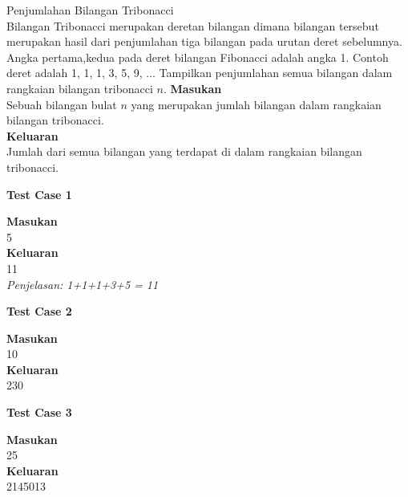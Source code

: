 \newpage
\begin{permasalahan}{Penjumlahan Bilangan Tribonacci}\\
	Bilangan Tribonacci merupakan deretan bilangan dimana bilangan tersebut merupakan hasil dari penjumlahan tiga bilangan pada urutan deret sebelumnya. Angka pertama,kedua pada deret bilangan Fibonacci adalah angka 1. Contoh deret adalah 1, 1, 1, 3, 5, 9, ... Tampilkan penjumlahan semua bilangan dalam rangkaian bilangan tribonacci $n$.
	\textbf{Masukan}\\
	Sebuah bilangan  bulat $n$ yang merupakan jumlah bilangan dalam rangkaian bilangan tribonacci.\\
	\textbf{Keluaran}\\
	Jumlah dari semua bilangan yang terdapat di dalam rangkaian bilangan tribonacci.\\
	\begin{center}
	\textbf{Test Case 1}\\
	\end{center}
	\textbf{Masukan}\\
	5\\
	\textbf{Keluaran}\\
	11\\
	\textit{Penjelasan: 1+1+1+3+5 = 11}\\
	\begin{center}
	\textbf{Test Case 2}\\
	\end{center}
	\textbf{Masukan}\\
	10\\
	\textbf{Keluaran}\\
	230\\
	\begin{center}
	\textbf{Test Case 3}\\
	\end{center}
	\textbf{Masukan}\\
	25\\
	\textbf{Keluaran}\\
	2145013\\
\end{permasalahan}
